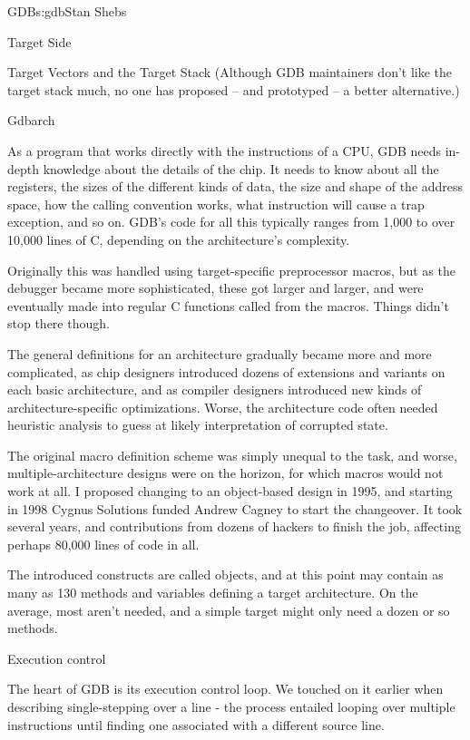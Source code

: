 \begin{aosachapter}{GDB}{s:gdb}{Stan Shebs}
\begin{aosasect1}{Target Side}
\begin{aosasect2}{Target Vectors and the Target Stack}
(Although GDB maintainers don't like the target stack much, no one has
proposed -- and prototyped -- a better alternative.)

\end{aosasect2}

\begin{aosasect2}{Gdbarch}

As a program that works directly with the instructions of a CPU, GDB
needs in-depth knowledge about the details of the chip.  It needs to
know about all the registers, the sizes of the different kinds of
data, the size and shape of the address space, how the calling
convention works, what instruction will cause a trap exception, and so
on.  GDB's code for all this typically ranges from 1,000 to over
10,000 lines of C, depending on the architecture's complexity.

Originally this was handled using target-specific preprocessor macros,
but as the debugger became more sophisticated, these got larger and
larger, and were eventually made into regular C functions called from
the macros.  Things didn't stop there though.

The general definitions for an architecture gradually became more and
more complicated, as chip designers introduced dozens of extensions
and variants on each basic architecture, and as compiler designers
introduced new kinds of architecture-specific optimizations.  Worse,
the architecture code often needed heuristic analysis to guess at
likely interpretation of corrupted state.

The original macro definition scheme was simply unequal to the task,
and worse, multiple-architecture designs were on the horizon, for
which macros would not work at all.  I proposed changing to an
object-based design in 1995, and starting in 1998 Cygnus Solutions
funded Andrew Cagney to start the changeover.  It took several years,
and contributions from dozens of hackers to finish the job, affecting
perhaps 80,000 lines of code in all.

The introduced constructs are called  objects, and at
this point may contain as many as 130 methods and variables defining
a target architecture.  On the average, most aren't needed, and a
simple target might only need a dozen or so methods.

\end{aosasect2}

\begin{aosasect2}{Execution control}

The heart of GDB is its execution control loop.  We touched on it earlier
when describing single-stepping over a line - the process entailed looping
over multiple instructions until finding one associated with a different
source line.


\end{aosasect2}
\end{aosasect1}
\end{aosachapter}
